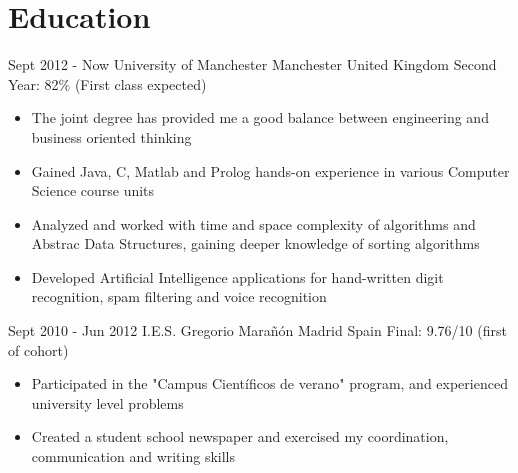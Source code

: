 \documentclass{CurriculumVitae}
\begin{document}
  \section{Education}
      {Sept 2012 - Now}
      {University of Manchester}
      {Manchester}
      {United Kingdom}
      {Second Year: 82\% (First class expected)}
      {\begin{itemize}
	  \vspace{-3mm}
	  \item The joint degree has provided me a good balance between engineering and business oriented thinking
	  \item Gained Java, C, Matlab and Prolog hands-on experience in various Computer Science course units
          \item Analyzed and worked with time and space complexity of algorithms and Abstrac Data Structures, gaining deeper knowledge of sorting algorithms
          \item Developed Artificial Intelligence applications for hand-written digit recognition, spam filtering and voice recognition
       \end{itemize}}

      {Sept 2010 - Jun 2012}
      {I.E.S. Gregorio Marañón}
      {Madrid}
      {Spain}
      {Final: 9.76/10 (first of cohort)}
      {\begin{itemize}
	  \vspace{-3mm}
	  \item Participated in the "Campus Científicos de verano" program, and experienced university level problems%
	  \item Created a student school newspaper and exercised my coordination, communication and writing skills
       \end{itemize}}
  \vspace{-5mm}
\end{document}
